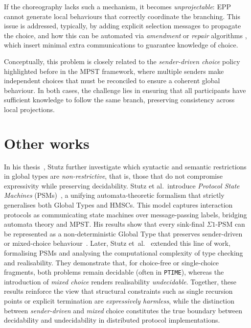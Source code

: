 If the choreography lacks such a mechanism, it becomes 
\emph{unprojectable}: EPP cannot generate local behaviours that 
correctly coordinate the branching. This issue 
is addressed, typically, by adding explicit selection messages to 
propagate the choice, and how this can be automated via 
\emph{amendment} or \emph{repair} algorithms 
\cite{DBLP:journals/corr/LaneseMZ13, basu2016automated}, 
which insert minimal extra 
communications to guarantee knowledge of choice.  

Conceptually, this problem is closely related to the \emph{sender-driven 
choice} policy highlighted before in the MPST framework, where 
multiple senders make independent choices that must be reconciled to 
ensure a coherent global behaviour. In both cases, the challenge lies 
in ensuring that all participants have sufficient knowledge to follow 
the same branch, preserving consistency across local projections. 


\section{Other works}
In his thesis~\cite{stutz2024implementability}, 
Stutz further investigate which syntactic and semantic
restrictions in global types are \emph{non-restrictive}, that is, those that
do not compromise expressivity while preserving decidability.  
Stutz et al.~introduce
\emph{Protocol State Machines} (PSMs)~\cite{stutz2025automata}, 
a unifying automata-theoretic
formalism that strictly generalises both Global Types and HMSCs.  
This model captures interaction protocols as communicating state
machines over message-passing labels, bridging automata theory and MPST.
His results show that every sink-final $\Sigma 1$-PSM can be represented
as a non-deterministic Global Type that preserves sender-driven or
mixed-choice behaviour~\cite[Thm.~8.14]{stutz2024implementability}.  
Later, Stutz et~al.~\cite{stutz2025automata} extended this line of work,
formalising PSMs and analysing the computational complexity of type
checking and realisability. They demonstrate that, for choice-free or
single-choice fragments, both problems remain decidable (often in
\verb|PTIME|), whereas the introduction of \emph{mixed choice} renders
realisability \emph{undecidable}.  
Together, these results reinforce the view that structural constraints
such as single recursion points or explicit termination are
\emph{expressively harmless}, while the distinction between
\emph{sender-driven} and \emph{mixed} choice constitutes the true
boundary between decidability and undecidability in distributed protocol
implementations.


